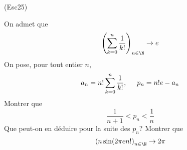 \begin{tiny}(Esc25)\end{tiny} On admet que 
\begin{displaymath}
 \left( \sum_{k=0}^n \frac{1}{k!}\right) _{n\in \N} \rightarrow e
\end{displaymath}
On pose, pour tout entier $n$,
\begin{displaymath}
 a_n = n!\sum_{k=0}^n \frac{1}{k!}, \hspace{0.5cm} p_n = n!e-a_n
\end{displaymath}
 Montrer que 
\begin{displaymath}
 \frac{1}{n+1} < p_n < \frac{1}{n}
\end{displaymath}
Que peut-on en déduire pour la suite des $p_n$? Montrer que
\begin{displaymath}
 \left( n\sin(2\pi e n!\right) _{n\in \N}\rightarrow 2\pi
\end{displaymath}

